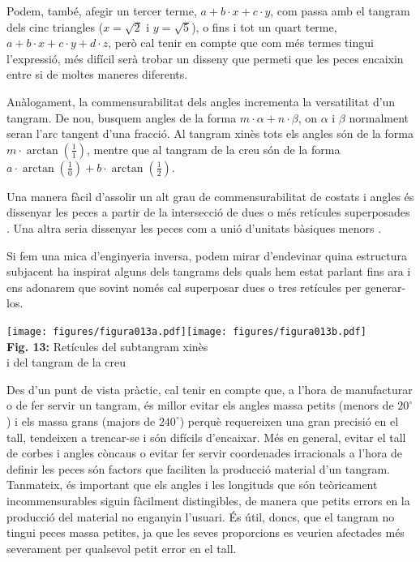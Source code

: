 \documentclass[a4paper,11pt]{article}
\begin{document}
\begin{multicols}{2}
            Podem, també, afegir un tercer terme, $a + b \cdot x + c \cdot y$, com passa amb el tangram dels cinc triangles ($x = \sqrt{2}$ i $y = \sqrt{5}$), o fins i tot un quart terme, $a + b \cdot x + c \cdot y + d \cdot z$, però cal tenir en compte que com més termes tingui l'expressió, més difícil serà trobar un disseny que permeti que les peces encaixin entre si de moltes maneres diferents.

            Anàlogament, la commensurabilitat dels angles incrementa la versatilitat d'un tangram. De nou, busquem angles de la forma $m \cdot \alpha + n \cdot \beta$, on $\alpha$ i $\beta$ normalment seran l'arc tangent d'una fracció. Al tangram xinès tots els angles són de la forma $m \cdot \arctan{(\tfrac{1}{1})}$, mentre que al tangram de la creu són de la forma $a \cdot \arctan{(\tfrac{1}{0})} + b \cdot \arctan{(\tfrac{1}{2})}$.

            Una manera fàcil d'assolir un alt grau de commensurabilitat de costats i angles és dissenyar les peces a partir de la intersecció de dues o més retícules superposades \cite{coffin2006geometric}. Una altra seria dissenyar les peces com a unió d'unitats bàsiques menors \cite{Horn2016family}.

            Si fem una mica d'enginyeria inversa, podem mirar d'endevinar quina estructura subjacent ha inspirat alguns dels tangrams dels quals hem estat parlant fins ara i ens adonarem que sovint només cal superposar dues o tres retícules per generar-los.

            \begin{center}
                \texttt{[image: figures/figura013a.pdf]}\qquad\texttt{[image: figures/figura013b.pdf]} \\
                \footnotesize{\textbf{Fig. 13:} Retícules del subtangram xinès\\ i del tangram de la creu}
            \end{center}

            Des d'un punt de vista pràctic, cal tenir en compte que, a l'hora de manufacturar o de fer servir un tangram, és millor evitar els angles massa petits (menors de $20^\circ$) i els massa grans (majors de $240^\circ$) perquè requereixen una gran precisió en el tall, tendeixen a trencar-se i són difícils d'encaixar. Més en general, evitar el tall de corbes i angles còncaus o evitar fer servir coordenades irracionals a l'hora de definir les peces són factors que faciliten la producció material d'un tangram. Tanmateix, és important que els angles i les longituds que són teòricament incommensurables siguin fàcilment distingibles, de manera que petits errors en la producció del material no enganyin l'usuari. És útil, doncs, que el tangram no tingui peces massa petites, ja que les seves proporcions es veurien afectades més severament per qualsevol petit error en el tall.


\end{multicols}
\end{document}
